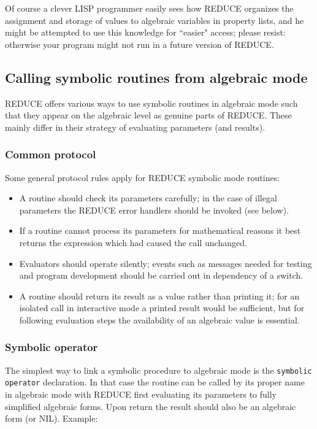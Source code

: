 \documentclass[11pt]{article}
\makeatletter
\newcommand{\reduce}{\small REDUCE}
\newcommand{\ttindex}[1]{\index{#1@{\texttt{#1}}}}
\makeatother
\begin{document}
Of course a clever LISP programmer easily sees how {\reduce}
organizes the assignment and storage of values to algebraic variables
in property lists, and he might be attempted
to use this knowledge for ``easier" access; please resist:
otherwise your program might not run in a future
version of {\reduce}.


\subsection{Calling symbolic routines from algebraic mode}

{\reduce} offers various ways to use symbolic routines
in algebraic mode such that they appear on the
algebraic level as genuine parts of {\reduce}. 
These mainly differ in their strategy of evaluating parameters 
(and results).

\subsubsection{Common protocol}

Some general protocol rules apply for {\reduce} symbolic mode
routines:
\begin{itemize}
\item A routine should check its parameters carefully; in
  the case of illegal parameters the {\reduce} error handlers
  should be invoked (see below).
\item If a routine cannot process its parameters for mathematical 
  reasons it best returns the expression which had caused the call
  unchanged.
\item Evaluators should operate silently; events such as messages needed
  for testing and program development should be carried out in
  dependency of a switch.
\item A routine should return its result as a value
  rather than printing it; for an isolated call in interactive
  mode a printed result would be sufficient, but for following evaluation
  steps the availability of an algebraic value is essential.
\end{itemize}

\subsubsection{Symbolic operator}

The simplest way to link a symbolic procedure to algebraic
mode is the {\tt symbolic operator}\ttindex{symbolic operator} declaration. 
In that case the routine can be called by its proper name in algebraic
mode with {\reduce} first evaluating its parameters to fully
simplified algebraic forms. Upon return the result
should also be an algebraic form (or NIL). Example:
\end{document}
